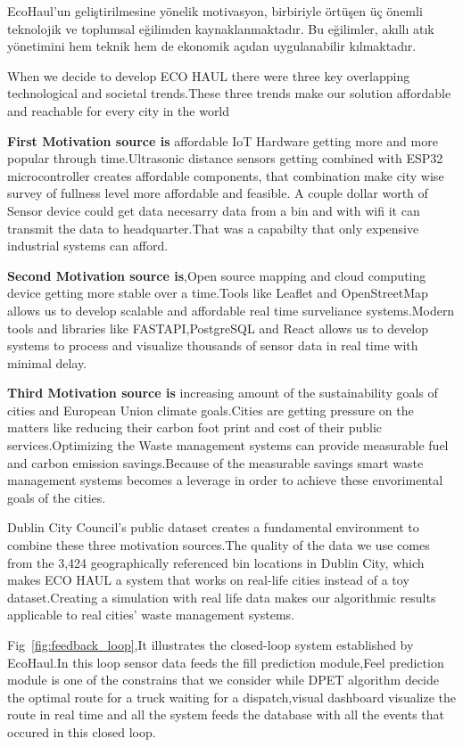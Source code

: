 \documentclass[12pt,a4paper]{report}
\begin{document}
\indent EcoHaul'un geliştirilmesine yönelik motivasyon, birbiriyle örtüşen üç önemli teknolojik ve toplumsal eğilimden kaynaklanmaktadır. Bu eğilimler, akıllı atık yönetimini hem teknik hem de ekonomik açıdan uygulanabilir kılmaktadır.

\indent When we decide to develop ECO HAUL there were three key overlapping technological  and societal  trends.These three trends make our solution affordable and reachable for every city in the world

\indent \textbf{First Motivation source is} affordable IoT Hardware getting more and more popular through time.Ultrasonic distance sensors getting combined with ESP32 microcontroller creates affordable components, that combination make city wise survey of fullness level more affordable and feasible. A couple dollar worth of Sensor device could get data necesarry data from a bin and with wifi it can transmit the data to headquarter.That was a capabilty that only expensive industrial systems can afford.

\indent \textbf{Second Motivation source is},Open source mapping and cloud computing device getting  more stable over a time.Tools like Leaflet and OpenStreetMap  allows us to develop scalable and affordable real time surveliance systems.Modern tools and libraries like FASTAPI,PostgreSQL and React allows us to develop systems to  process and visualize thousands of sensor data in real time with minimal delay.

\indent \textbf{Third Motivation source is} increasing amount of the sustainability goals of cities and European Union  climate goals.Cities are getting pressure on the matters like reducing their carbon foot print and cost of their public services.Optimizing the Waste management systems  can provide measurable  fuel and carbon emission savings.Because of the measurable savings smart waste management systems becomes a leverage in order to achieve these envorimental goals of the cities.

\indent Dublin City Council's public dataset creates a fundamental environment to combine these three motivation sources.The quality of the data we use comes from the 3,424 geographically referenced bin locations in Dublin City, which makes ECO HAUL a system that works on real-life cities instead of a toy dataset.Creating a simulation with real life data makes our algorithmic results applicable to real cities' waste management systems.

\indent  Fig~\ref{fig:feedback_loop},It illustrates the closed-loop system established by EcoHaul.In this loop sensor data feeds the fill prediction module,Feel prediction module is one of the constrains that we consider while DPET algorithm decide the optimal route for a truck waiting for a dispatch,visual dashboard visualize the route in real time and all the system feeds the database with all the events that occured in this closed loop.
\end{document}
